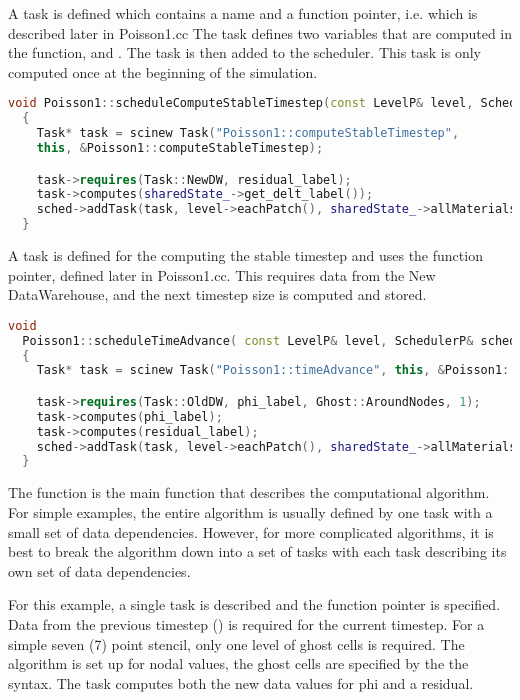 A task is defined which contains a name and a function pointer,
i.e.  which is described later in Poisson1.cc The
task defines two variables that are computed in the
 function,  and .  The
task is then added to the scheduler.  This task is only computed once
at the beginning of the simulation.

\begin{lstlisting}[language=Cpp]
  void Poisson1::scheduleComputeStableTimestep(const LevelP& level, SchedulerP& sched)
  {
    Task* task = scinew Task("Poisson1::computeStableTimestep",
    this, &Poisson1::computeStableTimestep);

    task->requires(Task::NewDW, residual_label);
    task->computes(sharedState_->get_delt_label());
    sched->addTask(task, level->eachPatch(), sharedState_->allMaterials());
  }

\end{lstlisting}

A task is defined for the computing the stable timestep and uses the
function pointer,  defined later in
Poisson1.cc.  This requires data from the New DataWarehouse, and the
next timestep size is computed and stored.

\begin{lstlisting}[language=Cpp]
  void
  Poisson1::scheduleTimeAdvance( const LevelP& level, SchedulerP& sched)
  {
    Task* task = scinew Task("Poisson1::timeAdvance", this, &Poisson1::timeAdvance);

    task->requires(Task::OldDW, phi_label, Ghost::AroundNodes, 1);
    task->computes(phi_label);
    task->computes(residual_label);
    sched->addTask(task, level->eachPatch(), sharedState_->allMaterials());
  }
\end{lstlisting}

The  function is the main function that describes
the computational algorithm.  For simple examples, the entire
algorithm is usually defined by one task with a small set of data
dependencies.  However, for more complicated algorithms, it is best to
break the algorithm down into a set of tasks with each task describing
its own set of data dependencies.

For this example, a single task is described and the
 function pointer is specified.  Data from the
previous timestep () is required for the current
timestep.  For a simple seven (7) point stencil, only one level of
ghost cells is required.  The algorithm is set up for nodal values,
the ghost cells are specified by the the 
syntax.  The task computes both the new data values for phi and a
residual.

